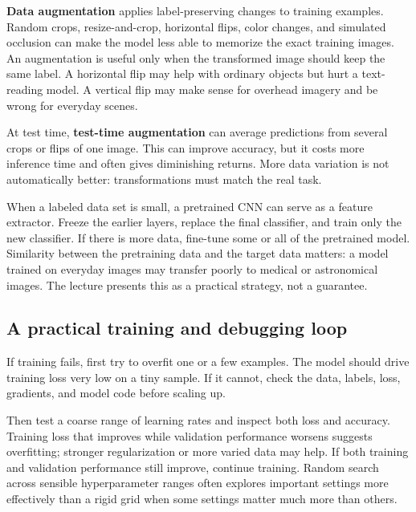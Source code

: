\hypertarget{04-visual-computing-ii-ch031-augmentation-and-pretrained-models-expand-what-small-data-can-do}{}

\textbf{Data augmentation} applies label-preserving changes to training examples. Random crops, resize-and-crop, horizontal flips, color changes, and simulated occlusion can make the model less able to memorize the exact training images. An augmentation is useful only when the transformed image should keep the same label. A horizontal flip may help with ordinary objects but hurt a text-reading model. A vertical flip may make sense for overhead imagery and be wrong for everyday scenes.

At test time, \textbf{test-time augmentation} can average predictions from several crops or flips of one image. This can improve accuracy, but it costs more inference time and often gives diminishing returns. More data variation is not automatically better: transformations must match the real task.

When a labeled data set is small, a pretrained CNN can serve as a feature extractor. Freeze the earlier layers, replace the final classifier, and train only the new classifier. If there is more data, fine-tune some or all of the pretrained model. Similarity between the pretraining data and the target data matters: a model trained on everyday images may transfer poorly to medical or astronomical images. The lecture presents this as a practical strategy, not a guarantee.

\subsection{A practical training and debugging loop}\label{04-visual-computing-ii-ch031-a-practical-training-and-debugging-loop}

\hypertarget{04-visual-computing-ii-ch031-a-practical-training-and-debugging-loop}{}

If training fails, first try to overfit one or a few examples. The model should drive training loss very low on a tiny sample. If it cannot, check the data, labels, loss, gradients, and model code before scaling up.

Then test a coarse range of learning rates and inspect both loss and accuracy. Training loss that improves while validation performance worsens suggests overfitting; stronger regularization or more varied data may help. If both training and validation performance still improve, continue training. Random search across sensible hyperparameter ranges often explores important settings more effectively than a rigid grid when some settings matter much more than others.

